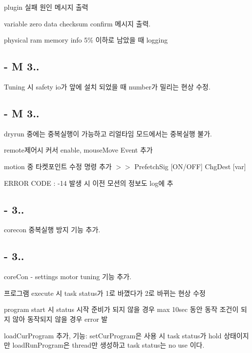 \begin{DoxyEnumerate}
\item plugin 실패 원인 메시지 출력
\item variable zero data checksum confirm 메시지 출력.
\item physical ram memory info 5\% 이하로 남았을 때 logging
\end{DoxyEnumerate}

\subsection*{-\/ M 3..}


\begin{DoxyEnumerate}
\item Tuning 시 safety io가 앞에 설치 되었을 때 number가 밀리는 현상 수정.
\end{DoxyEnumerate}

\subsection*{-\/ M 3..}


\begin{DoxyEnumerate}
\item dryrun 중에는 중복실행이 가능하고 리얼타임 모드에서는 중복실행 불가.
\item remote제어시 커서 enable, mouse\-Move Event 추가
\item motion 중 타켓포인트 수정 명령 추가 $>$$>$ Prefetch\-Sig \mbox{[}O\-N/\-O\-F\-F\mbox{]} Chg\-Dest \mbox{[}var\mbox{]}
\item E\-R\-R\-O\-R C\-O\-D\-E \-: -\/14 발생 시 이전 모션의 정보도 log에 추
\end{DoxyEnumerate}

\subsection*{-\/ 3..}


\begin{DoxyEnumerate}
\item corecon 중복실행 방지 기능 추가.
\end{DoxyEnumerate}

\subsection*{-\/ 3..}


\begin{DoxyEnumerate}
\item core\-Con -\/ settings motor tuning 기능 추가.
\item 프로그램 execute 시 task status가 1로 바꼈다가 2로 바뀌는 현상 수정
\item program start 시 status 시작 준비가 되지 않을 경우 max 10sec 동안 동작 조건이 되지 않아 동작되지 않을 경우 error 발
\item load\-Cur\-Program 추가, 기능\-: set\-Cur\-Program은 사용 시 task status가 hold 상태이지만 load\-Run\-Program은 thread만 생성하고 task status는 no use 이다.
\end{DoxyEnumerate}

